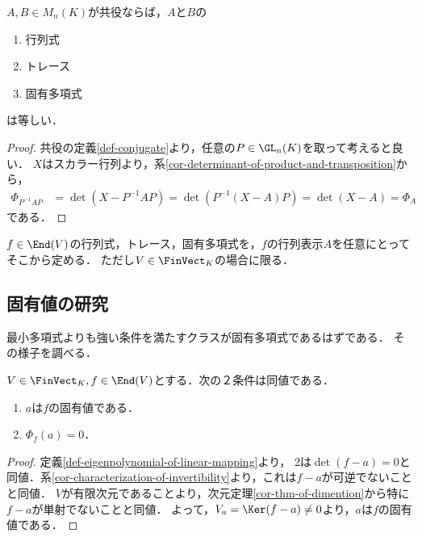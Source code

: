 \documentclass[uplatex, dvipdfmx]{jsreport}
\begin{document}
\begin{proposition}\label{prop-行列の特徴量は線型写像について定まっている}
    $A,B\in M_n(K)$が共役ならば，$A$と$B$の
    \begin{enumerate}
        \item 行列式
        \item トレース
        \item 固有多項式
    \end{enumerate}
    は等しい．
\end{proposition}
\begin{proof}
    共役の定義\ref{def-conjugate}より，任意の$P\in\GL_n(K)$を取って考えると良い．
    $X$はスカラー行列より，系\ref{cor-determinant-of-product-and-transposition}から，
    \begin{align*}
        \Phi_{P^{-1}AP}&=\det(X-P^{-1}AP)=\det(P^{-1}(X-A)P)=\det(X-A)=\Phi_A
    \end{align*}
    である．
\end{proof}

\begin{definition}[線型写像の固有多項式]\label{def-eigenpolynomial-of-linear-mapping}
    $f\in\End(V)$の行列式，トレース，固有多項式を，$f$の行列表示$A$を任意にとってそこから定める．
    ただし$V\in\FinVect_K$の場合に限る．
\end{definition}

\subsection{固有値の研究}

\begin{tcolorbox}[colframe=ForestGreen, colback=ForestGreen!10!white, breakable]
    最小多項式よりも強い条件を満たすクラスが固有多項式であるはずである．
    その様子を調べる．
\end{tcolorbox}

\begin{proposition}[固有値であることの特徴付け]
    $V\in\FinVect_K,f\in\End(V)$とする．次の２条件は同値である．
    \begin{enumerate}
        \item $a$は$f$の固有値である．
        \item $\Phi_f(a)=0$．
    \end{enumerate}
\end{proposition}
\begin{proof}
    定義\ref{def-eigenpolynomial-of-linear-mapping}より，
    2は$\det(f-a)=0$と同値．系\ref{cor-characterization-of-invertibility}より，これは$f-a$が可逆でないことと同値．
    $V$が有限次元であることより，次元定理\ref{cor-thm-of-dimention}から特に$f-a$が単射でないことと同値．
    よって，$V_a=\Ker(f-a)\ne 0$より，$a$は$f$の固有値である．
\end{proof}
\end{document}
